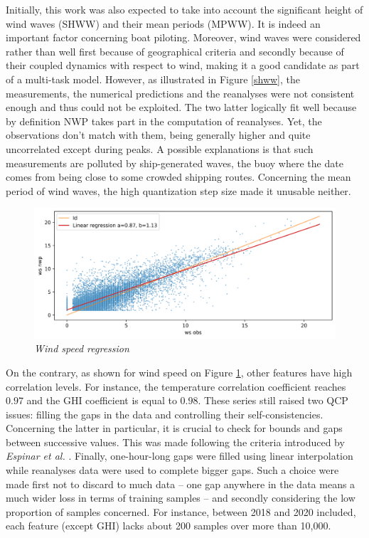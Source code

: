 \documentclass{article}
\begin{document}
Initially, this work was also expected to take into account the significant height of wind waves (SHWW)
and their mean periods (MPWW).
It is indeed an important factor concerning boat piloting. Moreover, wind waves were considered rather than well
first because of geographical criteria and secondly because of their coupled dynamics with respect to wind, making it
a good candidate as part of a multi-task model. However, as illustrated in Figure \ref{shww}, the measurements, the
numerical predictions and the reanalyses were not consistent enough and thus could not be exploited. The two
latter logically fit well because by definition NWP takes part in the computation of reanalyses. Yet, the observations
don't match with them, being generally higher and quite uncorrelated except during peaks.
A possible explanations is that such measurements
are polluted by ship-generated waves, the buoy where the date comes from being close to some crowded shipping
routes. Concerning the mean period of wind waves, the high quantization step size made it unusable neither.

\begin{figure}[H]
    \centering
    \includegraphics[width=\linewidth]{img/ws_compare.png}
    \caption{\textit{Wind speed regression}}
   \label{ws_straight}
\end{figure}

On the contrary, as shown for wind speed on Figure \ref{ws_straight}, other features have high correlation levels.
For instance, the temperature correlation coefficient reaches $0.97$ and the GHI coefficient is equal to $0.98$.
These series still raised two QCP issues: filling the gaps in the data and controlling their self-consistencies.
Concerning the latter in particular, it is crucial to check for bounds and gaps between successive values.
This was made following the criteria introduced by \emph{Espinar et al.} \cite{espinar_quality_nodate}.
Finally, one-hour-long gaps were filled using linear interpolation while reanalyses data were used
to complete bigger gaps. Such a choice were made first not to discard to much data -- one gap anywhere in
the data means a much wider loss in terms of training samples -- and secondly considering the low proportion
of samples concerned. For instance, between 2018 and 2020 included, each feature (except GHI) lacks about
200 samples over more than 10,000.
\end{document}
